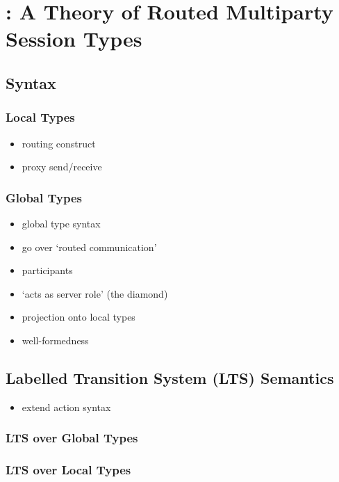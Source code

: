 \chapter{\newtheory: A Theory of
Routed Multiparty Session Types}
\label{chap:theory}

\section{Syntax}

\subsection{Local Types}

\begin{itemize}
\item routing construct
\item proxy send/receive
\end{itemize}

\subsection{Global Types}

\begin{itemize}
\item global type syntax
\item go over `routed communication'
\item participants
\item `acts as server role' (the diamond)
\item projection onto local types
\item well-formedness
\end{itemize}

\section{Labelled Transition System (LTS) Semantics}

\begin{itemize}
\item extend action syntax
\end{itemize}

\subsection{LTS over Global Types}

\subsection{LTS over Local Types}

